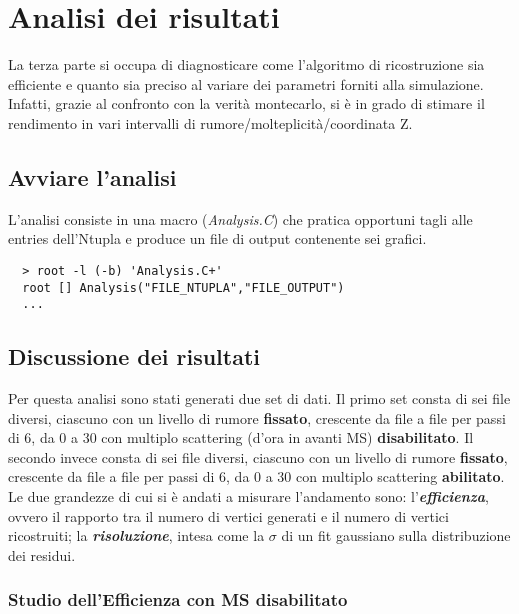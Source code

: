 \documentclass{article}
\begin{document}
\section{Analisi dei risultati}
La terza parte si occupa di diagnosticare come l'algoritmo di ricostruzione sia efficiente e quanto sia preciso al variare dei parametri forniti alla simulazione.
Infatti, grazie al confronto con la verità montecarlo, si è in grado di stimare il rendimento in vari intervalli di rumore/molteplicità/coordinata Z. 
\subsection{Avviare l'analisi}
\noindent L'analisi consiste in una macro (\textit{Analysis.C}) che pratica opportuni tagli alle entries dell'Ntupla e produce un file di output contenente sei grafici.
\begin{verbatim}
  > root -l (-b) 'Analysis.C+'
  root [] Analysis("FILE_NTUPLA","FILE_OUTPUT")
  ...
\end{verbatim}
\subsection{Discussione dei risultati}
Per questa analisi sono stati generati due set di dati.
Il primo set consta di sei file diversi, ciascuno con un livello di rumore \textbf{fissato}, crescente da file a file per passi di 6, da 0 a 30 con multiplo scattering (d'ora in avanti MS) \textbf{disabilitato}.
Il secondo invece consta di sei file diversi, ciascuno con un livello di rumore \textbf{fissato}, crescente da file a file per passi di 6, da 0 a 30 con multiplo scattering \textbf{abilitato}.
Le due grandezze di cui si è andati a misurare l'andamento sono: l'\textbf{\textit{efficienza}}, ovvero il rapporto tra il numero di vertici generati e il numero di vertici ricostruiti; la \textbf{\textit{risoluzione}}, intesa come la $\sigma$ di un fit gaussiano sulla distribuzione dei residui.

\subsubsection{Studio dell'Efficienza con MS disabilitato}
\end{document}
